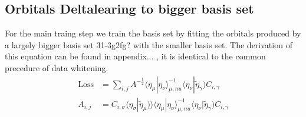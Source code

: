 \subsection{Orbitals Deltalearing to bigger basis set}
For the main traing step we train the basis set by fitting the orbitals produced by a largely bigger basis set 31-3g2fg? with the smaller basis set.
The derivation of this equation can be found in appendix... , it is identical to the common precedure of data whitening.
\begin{align}
    \text{Loss} &= \sum_{i,j} A^{-\frac{1}{2}} \langle\eta_\mu|\eta_\nu\rangle^{-1}_{\mu,nu} \langle\eta_\nu|\tilde\eta_\gamma) C_{i,\gamma}\\
    A_{i,j}&=C_{i,\sigma}\langle\eta_\sigma|\tilde\eta_\mu)\rangle \langle\eta_\mu|\eta_\nu\rangle^{-1}_{\mu,nu} \langle\eta_\nu|\tilde\eta_\gamma) C_{i,\gamma}\\
\end{align}





